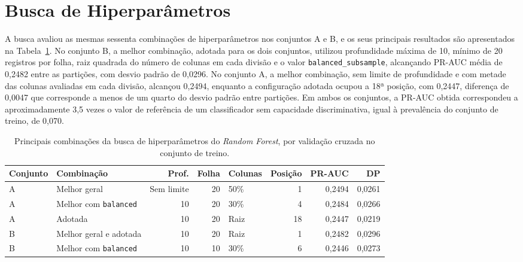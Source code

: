 \section{Busca de Hiperparâmetros}\label{sec:res-busca}
A busca avaliou as mesmas sessenta combinações de hiperparâmetros nos conjuntos A e B, e os seus principais resultados são apresentados na Tabela~\ref{tab:busca}. No conjunto B, a melhor combinação, adotada para os dois conjuntos, utilizou profundidade máxima de 10, mínimo de 20 registros por folha, raiz quadrada do número de colunas em cada divisão e o valor \texttt{balanced\_subsample}, alcançando PR-AUC média de 0,2482 entre as partições, com desvio padrão de 0,0296. No conjunto A, a melhor combinação, sem limite de profundidade e com metade das colunas avaliadas em cada divisão, alcançou 0,2494, enquanto a configuração adotada ocupou a 18ª posição, com 0,2447, diferença de 0,0047 que corresponde a menos de um quarto do desvio padrão entre partições. Em ambos os conjuntos, a PR-AUC obtida correspondeu a aproximadamente 3,5 vezes o valor de referência de um classificador sem capacidade discriminativa, igual à prevalência do conjunto de treino, de 0,070.

\begin{table}[htb]
  \centering
  \caption{\label{tab:busca}Principais combinações da busca de hiperparâmetros do \textit{Random Forest}, por validação cruzada no conjunto de treino.}
  \footnotesize
  \setlength{\tabcolsep}{4pt}
  \begin{tabular}{llrrlrrr}
    \hline
    Conjunto & Combinação & Prof. & Folha & Colunas & Posição & PR-AUC & DP \\ \hline
    A & Melhor geral & Sem limite & 20 & 50\% & 1 & 0,2494 & 0,0261 \\
    A & Melhor com \texttt{balanced} & 10 & 20 & 30\% & 4 & 0,2484 & 0,0266 \\
    A & Adotada & 10 & 20 & Raiz & 18 & 0,2447 & 0,0219 \\
    B & Melhor geral e adotada & 10 & 20 & Raiz & 1 & 0,2482 & 0,0296 \\
    B & Melhor com \texttt{balanced} & 10 & 10 & 30\% & 6 & 0,2446 & 0,0273 \\ \hline
  \end{tabular}
\end{table}

